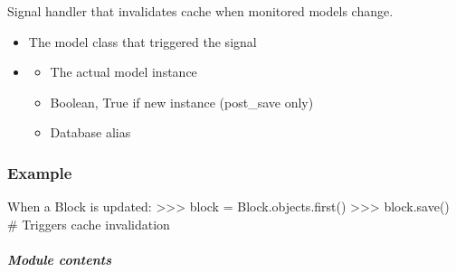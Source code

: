 \documentclass[letterpaper,10pt,english]{sphinxmanual}
\begin{document}
\begin{fulllineitems}
\label{\detokenize{pages_app.models:pages_app.models.signals.invalidate_cache}}
\pysigstartsignatures
\pysiglinewithargsret
{}
{\sphinxparamcomma {}}
{}
\pysigstopsignatures
\sphinxAtStartPar
Signal handler that invalidates cache when monitored models change.

\sphinxAtStartPar
{}
\begin{itemize}
\item {} 
\sphinxAtStartPar
{} The model class that triggered the signal

\item {} \begin{description}
\begin{itemize}
\item {} 
\sphinxAtStartPar
{} The actual model instance

\item {} 
\sphinxAtStartPar
{} Boolean, True if new instance (post\_save only)

\item {} 
\sphinxAtStartPar
{} Database alias

\end{itemize}

\end{description}

\end{itemize}
\subsubsection*{Example}

\sphinxAtStartPar
When a Block is updated:
\textgreater{}\textgreater{}\textgreater{} block = Block.objects.first()
\textgreater{}\textgreater{}\textgreater{} block.save()  \# Triggers cache invalidation

\end{fulllineitems}



\subparagraph{Module contents}
\label{\detokenize{pages_app.models:module-pages_app.models}}\label{\detokenize{pages_app.models:module-contents}}
\end{document}
